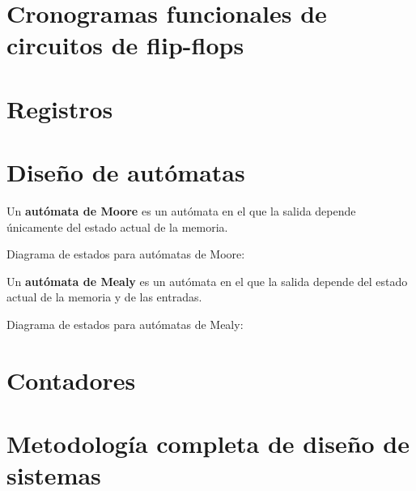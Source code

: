 \documentclass[a4paper]{book}
\numberwithin{figure}{chapter}
\numberwithin{equation}{chapter}
\begin{document}
\section{Cronogramas funcionales de circuitos de flip-flops}
\section{Registros}
\section{Diseño de autómatas}
Un \textbf{autómata de Moore} es un autómata en el que la salida depende únicamente del estado actual de la memoria.

Diagrama de estados para autómatas de Moore:

Un \textbf{autómata de Mealy} es un autómata en el que la salida depende del estado actual de la memoria y de las entradas.

Diagrama de estados para autómatas de Mealy:

\section{Contadores}
\section{Metodología completa de diseño de sistemas}




%
% 
\end{document}
